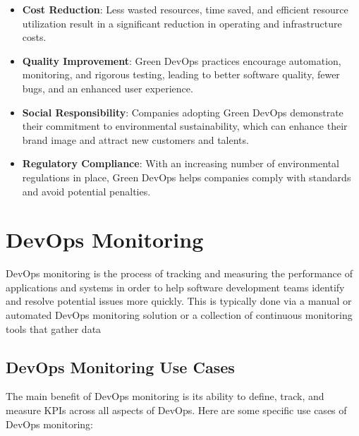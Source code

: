 \begin{itemize}
  \item \textbf{Cost Reduction}: Less wasted resources, time saved, and efficient resource utilization result in a significant reduction in operating and infrastructure costs.
  
  \item \textbf{Quality Improvement}: Green DevOps practices encourage automation, monitoring, and rigorous testing, leading to better software quality, fewer bugs, and an enhanced user experience.
  
  \item \textbf{Social Responsibility}: Companies adopting Green DevOps demonstrate their commitment to environmental sustainability, which can enhance their brand image and attract new customers and talents.
  
  \item \textbf{Regulatory Compliance}: With an increasing number of environmental regulations in place, Green DevOps helps companies comply with standards and avoid potential penalties.
\end{itemize}

\section{DevOps Monitoring}
DevOps monitoring is the process of tracking and measuring the performance of applications and systems in order to help software development teams identify and resolve potential issues more quickly. This is typically done via a manual or automated DevOps monitoring solution or a collection of continuous monitoring tools that gather data

\subsection*{DevOps Monitoring Use Cases}

The main benefit of DevOps monitoring is its ability to define, track, and measure KPIs across all aspects of DevOps. Here are some specific use cases of DevOps monitoring:

